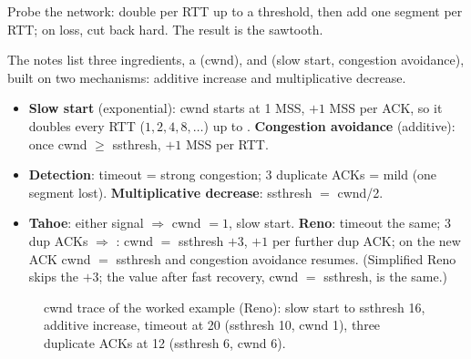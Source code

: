 \begin{intuitionbox}
Probe the network: double per RTT up to a threshold, then add one segment per RTT; on loss, cut back hard. The result is the  sawtooth.
\end{intuitionbox}

The notes list three ingredients, a  (cwnd),  and  (slow start, congestion avoidance), built on two mechanisms: additive increase and multiplicative decrease. 

\begin{itemize}
  \item \textbf{Slow start} (exponential): cwnd starts at 1 MSS, $+1$ MSS per ACK, so it doubles every RTT ($1,2,4,8,\ldots$) up to . \textbf{Congestion avoidance} (additive): once cwnd $\ge$ ssthresh, $+1$ MSS per RTT. 
  \item \textbf{Detection}: timeout = strong congestion; 3 duplicate ACKs = mild (one segment lost). \textbf{Multiplicative decrease}: ssthresh $=$ cwnd/2.
  \item \textbf{Tahoe}: either signal $\Rightarrow$ cwnd $=1$, slow start. \textbf{Reno}: timeout the same; 3 dup ACKs $\Rightarrow$ : cwnd $=$ ssthresh $+3$, $+1$ per further dup ACK; on the new ACK cwnd $=$ ssthresh and congestion avoidance resumes. (Simplified Reno skips the $+3$; the value after fast recovery, cwnd $=$ ssthresh, is the same.)
\end{itemize}

\begin{figure}[!htbp]\centering
{}
\caption{cwnd trace of the worked example (Reno): slow start to ssthresh 16, additive increase, timeout at 20 (ssthresh 10, cwnd 1), three duplicate ACKs at 12 (ssthresh 6, cwnd 6).}
\end{figure}





